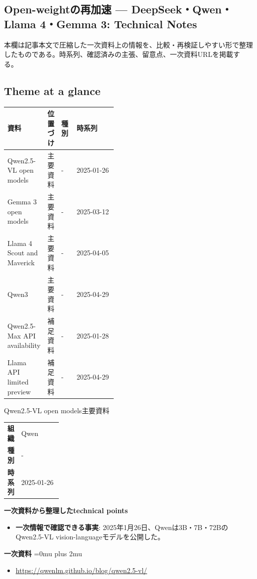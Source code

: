 \subsection*{Open-weightの再加速 — DeepSeek・Qwen・Llama 4・Gemma 3: Technical Notes}
本欄は記事本文で圧縮した一次資料上の情報を、比較・再検証しやすい形で整理したものである。時系列、確認済みの主張、留意点、一次資料URLを掲載する。
\medskip
\subsection*{Theme at a glance}
\begin{center}
\footnotesize
\begin{tabularx}{\linewidth}{@{}p{0.20\linewidth}p{0.10\linewidth}p{0.14\linewidth}X@{}}
\toprule
資料 & 位置づけ & 種別 & 時系列 \\
\midrule
Qwen2.5-VL open models & 主要資料 & - & 2025-01-26   \\
Gemma 3 open models & 主要資料 & - & 2025-03-12   \\
Llama 4 Scout and Maverick & 主要資料 & - & 2025-04-05   \\
Qwen3 & 主要資料 & - & 2025-04-29   \\
Qwen2.5-Max API availability & 補足資料 & - & 2025-01-28   \\
Llama API limited preview & 補足資料 & - & 2025-04-29   \\
\bottomrule
\end{tabularx}
\end{center}
\normalsize

\begin{technicalnote}{Qwen2.5-VL open models}{主要資料}
\begingroup
\begin{tabularx}{\linewidth}{@{}>{\bfseries}p{0.22\linewidth}X@{}}
組織 & Qwen \\
種別 & - \\
時系列 & 2025-01-26 \\
\end{tabularx}
\smallskip
{\bfseries 一次資料から整理したtechnical points}
\begin{itemize}[leftmargin=1.5em,itemsep=0.35em]
\item \textbf{一次情報で確認できる事実}: 2025年1月26日、Qwenは3B・7B・72BのQwen2.5-VL vision-languageモデルを公開した。
\end{itemize}
\begin{samepage}
{\bfseries 一次資料}
\begingroup\sloppy
\Urlmuskip=0mu plus 2mu\relax
\begin{itemize}[leftmargin=1.5em,itemsep=0.25em]
\item {\scriptsize\url{https://qwenlm.github.io/blog/qwen2.5-vl/}}
\end{itemize}
\endgroup
\end{samepage}
\endgroup
\end{technicalnote}
\medskip

